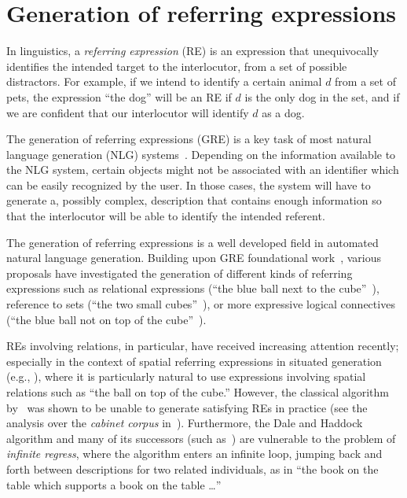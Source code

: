 \section{Generation of referring expressions}\label{sec:gre}

In linguistics, a \emph{referring expression} (RE) is an expression that 
unequivocally identifies the intended target to the interlocutor, from a set of possible distractors.  
For example, if we intend to identify a certain animal $d$ from a set of pets, the expression 
``the dog'' will be an RE if $d$ is the only dog in the set, and if we are confident
that our interlocutor will identify $d$ as a dog. 

The generation of referring expressions (GRE)  is a key task of most natural 
language generation (NLG) systems~\cite[Section 5.4]{dale2000}. 
Depending on the information available to the NLG system, certain objects might 
not be associated with an identifier which can be easily recognized by the user. 
In those cases, the system will have to generate a, possibly complex, description that contains 
enough information so that the interlocutor will be able to identify the intended referent.

The generation of referring expressions is a well developed field in automated natural language generation.
Building upon GRE foundational work~\cite{winograd,dale89cooking,Dale1995},
various proposals have investigated the generation of different kinds of referring expressions 
such as relational expressions (``the blue ball next to the cube''~\cite{dale91:_gener_refer_expres_invol_relat}),
reference to sets (``the two small cubes''~\cite{Stone2000}), or more expressive logical connectives (``the 
blue ball not on top of the cube''~\cite{deemter02:_gener_refer_expres}).

REs involving relations, in particular, have
received increasing attention recently; especially in the context of
spatial referring expressions in situated generation (e.g., \cite{kelleher06:_increm_gener_of_spatial_refer}), where it is
particularly natural to use expressions involving spatial relations such as ``the ball on top of the cube.''  However, the classical algorithm by~ was shown to be unable to generate satisfying REs in practice (see the 
analysis over the \emph{cabinet corpus} in~\cite{viethen06:_algor_for_gener_refer_expres}).  Furthermore, the Dale
and Haddock algorithm and many of its successors (such as~\cite{kelleher06:_increm_gener_of_spatial_refer}) are vulnerable to
the problem of \emph{infinite regress}, where the algorithm enters an infinite loop, jumping back
and forth between descriptions for two related individuals, as in ``the book on the table which supports a book on the
table \ldots''


